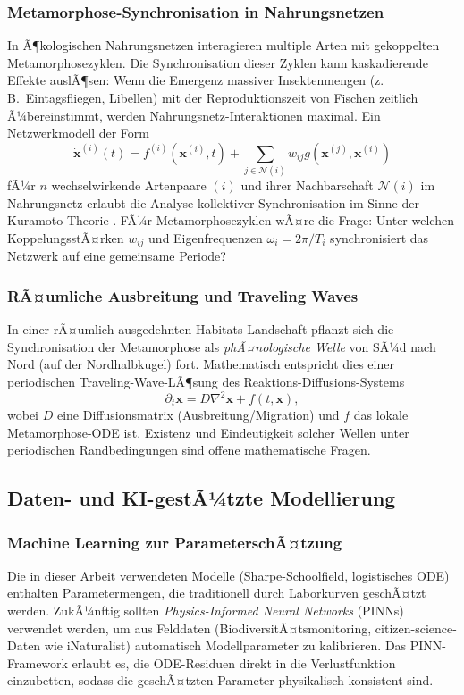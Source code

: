 ﻿\documentclass[12pt, a4paper]{article}
\theoremstyle{definition}
\begin{document}
\subsubsection{Metamorphose-Synchronisation in Nahrungsnetzen}
In Ã¶kologischen Nahrungsnetzen interagieren multiple Arten mit gekoppelten
Metamorphosezyklen. Die Synchronisation dieser Zyklen kann kaskadierende Effekte
auslÃ¶sen: Wenn die Emergenz massiver Insektenmengen (z.\,B.\ Eintagsfliegen,
Libellen) mit der Reproduktionszeit von Fischen zeitlich Ã¼bereinstimmt, werden
Nahrungsnetz-Interaktionen maximal. Ein Netzwerkmodell der Form
\[
  \dot{\bm{x}}^{(i)}(t) = f^{(i)}(\bm{x}^{(i)}, t) +
  \sum_{j \in \mathcal{N}(i)} w_{ij} g(\bm{x}^{(j)}, \bm{x}^{(i)})
\]
fÃ¼r $n$ wechselwirkende Artenpaare $(i)$ und ihrer Nachbarschaft $\mathcal{N}(i)$
im Nahrungsnetz erlaubt die Analyse kollektiver Synchronisation im Sinne der
Kuramoto-Theorie \cite{Kuramoto1984}. FÃ¼r Metamorphosezyklen wÃ¤re die Frage: Unter
welchen KoppelungsstÃ¤rken $w_{ij}$ und Eigenfrequenzen $\omega_i = 2\pi/T_i$
synchronisiert das Netzwerk auf eine gemeinsame Periode?

\subsubsection{RÃ¤umliche Ausbreitung und Traveling Waves}
In einer rÃ¤umlich ausgedehnten Habitats-Landschaft pflanzt sich die Synchronisation
der Metamorphose als \emph{phÃ¤nologische Welle} von SÃ¼d nach Nord (auf der
Nordhalbkugel) fort. Mathematisch entspricht dies einer periodischen Traveling-Wave-LÃ¶sung
des Reaktions-Diffusions-Systems
\[
  \partial_t \bm{x} = D\nabla^2 \bm{x} + f(t, \bm{x}),
\]
wobei $D$ eine Diffusionsmatrix (Ausbreitung/Migration) und $f$ das lokale
Metamorphose-ODE ist. Existenz und Eindeutigkeit solcher Wellen unter periodischen
Randbedingungen sind offene mathematische Fragen.

\subsection{Daten- und KI-gestÃ¼tzte Modellierung}

\subsubsection{Machine Learning zur ParameterschÃ¤tzung}
Die in dieser Arbeit verwendeten Modelle (Sharpe-Schoolfield, logistisches ODE)
enthalten Parametermengen, die traditionell durch Laborkurven geschÃ¤tzt werden.
ZukÃ¼nftig sollten \emph{Physics-Informed Neural Networks} (PINNs) \cite{Raissi2019}
verwendet werden, um aus Felddaten (BiodiversitÃ¤tsmonitoring, citizen-science-Daten
wie iNaturalist) automatisch Modellparameter zu kalibrieren. Das PINN-Framework
erlaubt es, die ODE-Residuen direkt in die Verlustfunktion einzubetten, sodass
die geschÃ¤tzten Parameter physikalisch konsistent sind.
\end{document}

